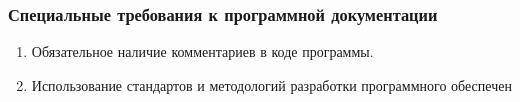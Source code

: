  \subsubsection{Специальные требования к программной документации}
 \begin{enumerate}
  \item Обязательное наличие комментариев в коде программы.
  \item Использование стандартов и методологий разработки программного обеспечен
 \end{enumerate}


